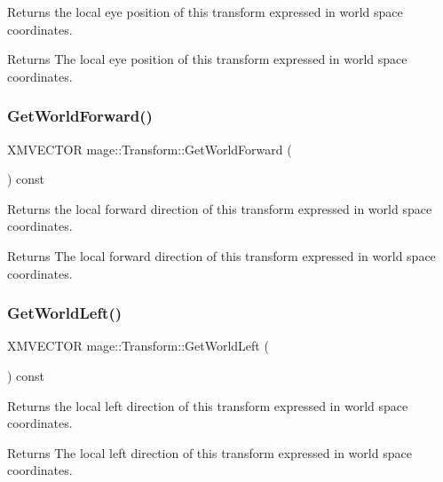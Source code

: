 Returns the local eye position of this transform expressed in world space coordinates.

\begin{DoxyReturn}{Returns}
The local eye position of this transform expressed in world space coordinates. 
\end{DoxyReturn}
\hypertarget{structmage_1_1_transform_a24bd3a710a3c0bde7a6d2f2de56a315c}{}\label{structmage_1_1_transform_a24bd3a710a3c0bde7a6d2f2de56a315c} 
\subsubsection{\texorpdfstring{Get\+World\+Forward()}{GetWorldForward()}}
{\footnotesize\ttfamily X\+M\+V\+E\+C\+T\+OR mage\+::\+Transform\+::\+Get\+World\+Forward (\begin{DoxyParamCaption}{ }\end{DoxyParamCaption}) const}

Returns the local forward direction of this transform expressed in world space coordinates.

\begin{DoxyReturn}{Returns}
The local forward direction of this transform expressed in world space coordinates. 
\end{DoxyReturn}
\hypertarget{structmage_1_1_transform_aef18a0e685f56ce4a805b2fef57287f6}{}\label{structmage_1_1_transform_aef18a0e685f56ce4a805b2fef57287f6} 
\subsubsection{\texorpdfstring{Get\+World\+Left()}{GetWorldLeft()}}
{\footnotesize\ttfamily X\+M\+V\+E\+C\+T\+OR mage\+::\+Transform\+::\+Get\+World\+Left (\begin{DoxyParamCaption}{ }\end{DoxyParamCaption}) const}

Returns the local left direction of this transform expressed in world space coordinates.

\begin{DoxyReturn}{Returns}
The local left direction of this transform expressed in world space coordinates. 
\end{DoxyReturn}
\hypertarget{structmage_1_1_transform_aad81c0c7af0f29bb3ead6c8112de262c}{}\label{structmage_1_1_transform_aad81c0c7af0f29bb3ead6c8112de262c} 
